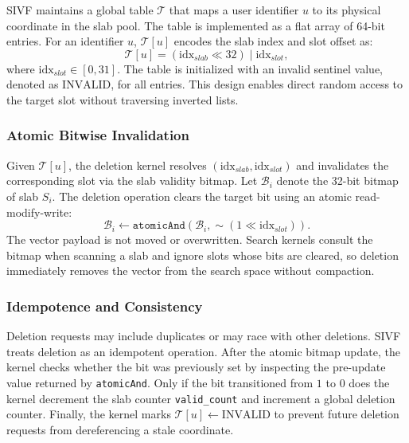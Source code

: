 \documentclass[sigconf,anonymous]{acmart}
\theoremstyle{plain}
\theoremstyle{definition}
\theoremstyle{remark}
\begin{document}
SIVF maintains a global table $\mathcal{T}$ that maps a user identifier $u$ to its physical coordinate in the slab pool. The table is implemented as a flat array of 64-bit entries. For an identifier $u$, $\mathcal{T}[u]$ encodes the slab index and slot offset as:
\begin{equation}
\label{eq:att_encoding}
\mathcal{T}[u] = (\text{idx}_{slab} \ll 32) \mid \text{idx}_{slot},
\end{equation}
where $\text{idx}_{slot} \in [0, 31]$. The table is initialized with an invalid sentinel value, denoted as $\text{INVALID}$, for all entries. This design enables direct random access to the target slot without traversing inverted lists.

\subsubsection{Atomic Bitwise Invalidation}

Given $\mathcal{T}[u]$, the deletion kernel resolves $(\text{idx}_{slab}, \text{idx}_{slot})$ and invalidates the corresponding slot via the slab validity bitmap. Let $\mathcal{B}_{i}$ denote the 32-bit bitmap of slab $S_i$. The deletion operation clears the target bit using an atomic read-modify-write:
\begin{equation}
\label{eq:bitmap_clear}
\mathcal{B}_{i} \leftarrow \texttt{atomicAnd}(\mathcal{B}_{i}, \sim(1 \ll \text{idx}_{slot})).
\end{equation}
The vector payload is not moved or overwritten. Search kernels consult the bitmap when scanning a slab and ignore slots whose bits are cleared, so deletion immediately removes the vector from the search space without compaction.

\subsubsection{Idempotence and Consistency}

Deletion requests may include duplicates or may race with other deletions. SIVF treats deletion as an idempotent operation. After the atomic bitmap update, the kernel checks whether the bit was previously set by inspecting the pre-update value returned by \texttt{atomicAnd}. Only if the bit transitioned from $1$ to $0$ does the kernel decrement the slab counter \texttt{valid\_count} and increment a global deletion counter. Finally, the kernel marks $\mathcal{T}[u] \leftarrow \text{INVALID}$ to prevent future deletion requests from dereferencing a stale coordinate.
\end{document}
